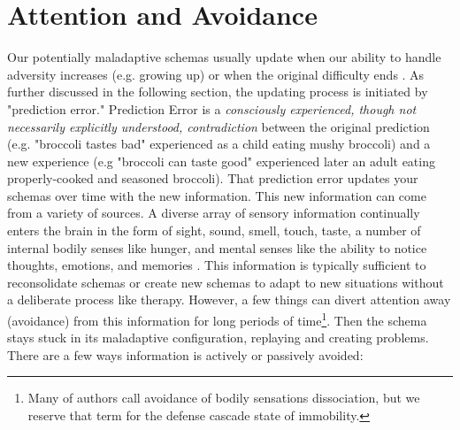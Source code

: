 \documentclass[12pt,letterpaper]{book}
\begin{document}
\section{Attention and Avoidance}
\label{attention}
Our potentially maladaptive schemas usually update when our ability to handle adversity increases (e.g. growing up) or when the original difficulty ends \cite{eckerUnlocking}. As further discussed in the following section, the updating process is initiated by "prediction error." Prediction Error is a \textit{consciously experienced, though not necessarily explicitly understood, contradiction} between the original prediction (e.g. "broccoli tastes bad" experienced as a child eating mushy broccoli) and a new experience (e.g "broccoli can taste good" experienced later an adult eating properly-cooked and seasoned broccoli). That prediction error updates your schemas over time with the new information. This new information can come from a variety of sources. A diverse array of sensory information continually enters the brain in the form of sight, sound, smell, touch, taste, a number of internal bodily senses like hunger, and mental senses like the ability to notice thoughts, emotions, and memories \cite{berghSelfEvidencing}. This information is typically sufficient to reconsolidate schemas or create new schemas to adapt to new situations without a deliberate process like therapy. However, a few things can divert attention away (avoidance) from this information for long periods of time\footnote{Many of authors call avoidance of bodily sensations dissociation, but we reserve that term for the defense cascade state of immobility.}. Then the schema stays stuck in its maladaptive configuration, replaying and creating problems. There are a few ways information is actively or passively avoided:
\end{document}
